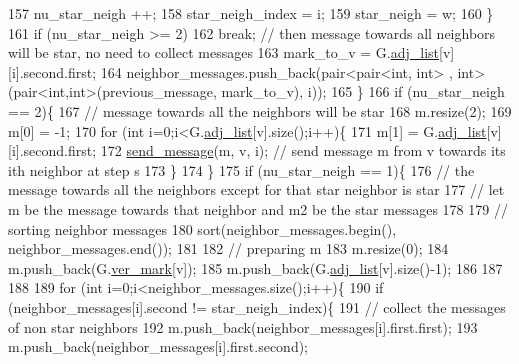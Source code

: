 \begin{DoxyCode}
157               nu\_star\_neigh ++;
158               star\_neigh\_index = i;
159               star\_neigh = w;
160             \}
161             \textcolor{keywordflow}{if} (nu\_star\_neigh >= 2)
162               \textcolor{keywordflow}{break}; \textcolor{comment}{// then message towards all neighbors will be star, no need to collect messages}
163             mark\_to\_v = G.\hyperlink{classmarked__graph_a1a0bf7ca413a278763f7c878b3b6fd6f}{adj\_list}[v][i].second.first;
164             neighbor\_messages.push\_back(pair<pair<int, int> , \textcolor{keywordtype}{int}> (pair<int,int>(previous\_message, 
      mark\_to\_v), i));
165           \}
166           \textcolor{keywordflow}{if} (nu\_star\_neigh == 2)\{
167             \textcolor{comment}{// message towards all the neighbors will be star}
168             m.resize(2);
169             m[0] = -1;
170             \textcolor{keywordflow}{for} (\textcolor{keywordtype}{int} i=0;i<G.\hyperlink{classmarked__graph_a1a0bf7ca413a278763f7c878b3b6fd6f}{adj\_list}[v].size();i++)\{
171               m[1] = G.\hyperlink{classmarked__graph_a1a0bf7ca413a278763f7c878b3b6fd6f}{adj\_list}[v][i].second.first; 
172               \hyperlink{classgraph__message_aa76d1d5420a12477fa1dddd878d78c8f}{send\_message}(m, v, i); \textcolor{comment}{// send message m from v towards its ith neighbor at step
       s}
173             \}
174           \}
175           \textcolor{keywordflow}{if} (nu\_star\_neigh == 1)\{
176             \textcolor{comment}{// the message towards all the neighbors except for that star neighbor is star}
177             \textcolor{comment}{// let m be the message towards that neighbor and m2 be the star messages}
178 
179             \textcolor{comment}{// sorting neighbor messages}
180             sort(neighbor\_messages.begin(), neighbor\_messages.end());
181 
182             \textcolor{comment}{// preparing m }
183             m.resize(0);
184             m.push\_back(G.\hyperlink{classmarked__graph_ac83e9377dd4d8bb95be1ac949b127296}{ver\_mark}[v]);
185             m.push\_back(G.\hyperlink{classmarked__graph_a1a0bf7ca413a278763f7c878b3b6fd6f}{adj\_list}[v].size()-1);
186 
187             
188 
189             \textcolor{keywordflow}{for} (\textcolor{keywordtype}{int} i=0;i<neighbor\_messages.size();i++)\{
190               \textcolor{keywordflow}{if} (neighbor\_messages[i].second != star\_neigh\_index)\{
191                 \textcolor{comment}{// collect the messages of non star neighbors}
192                 m.push\_back(neighbor\_messages[i].first.first);
193                 m.push\_back(neighbor\_messages[i].first.second);

\end{DoxyCode}
